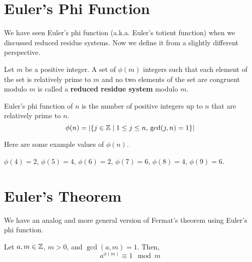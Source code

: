 \section{Euler's Phi Function}

We have seen Euler's phi function (a.k.a. Euler's totient function) when we discussed reduced residue systems. Now we define it from a slightly different perspective.

\begin{definition}
    Let $m$ be a positive integer. A set of $\phi(m)$ integers such that each element of the set is relatively prime to $m$ and no two elements of the set are congruent modulo $m$ is called a \textbf{reduced residue system} modulo $m$.
\end{definition}

\begin{definition}
    Euler's phi function of $n$ is the number of positive integers up to $n$ that are relatively prime to $n$.
    $$
    \phi(n) = |\{j \in \mathbb{Z} \mid 1 \leq j \leq n,\, \gcd(j,n) = 1\}|
    $$
\end{definition}

Here are some example values of $\phi(n)$.
\begin{example}
    $\phi(4) = 2$, $\phi(5) = 4$, $\phi(6) = 2$, $\phi(7) = 6$, $\phi(8) = 4$, $\phi(9) = 6$.
\end{example}

\section{Euler's Theorem}

We have an analog and more general version of Fermat's theorem using Euler's phi function.

\begin{theorem}
    Let $a,m \in \mathbb{Z}$, $m > 0$, and $\gcd(a,m) = 1$. Then,
    $$
    a^{\phi(m)} \equiv 1 \mod m
    $$
\end{theorem}

